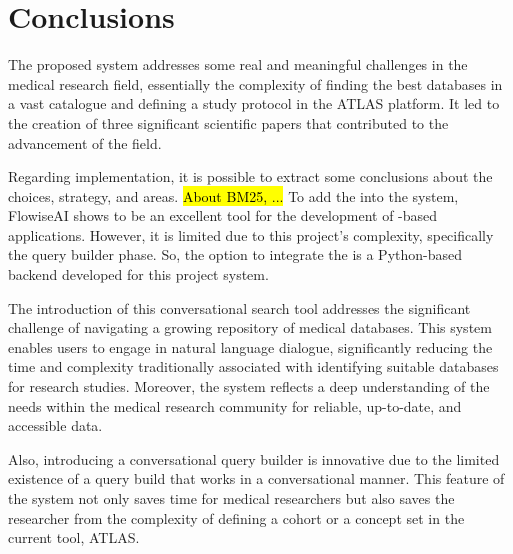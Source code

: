 \chapter{Conclusions}
\label{chapter:Conclusions}




The proposed system addresses some real and meaningful challenges in the medical research field, essentially the complexity of finding the best databases in a vast catalogue and defining a study protocol in the ATLAS platform. It led to the creation of three significant scientific papers that contributed to the advancement of the field.

Regarding implementation, it is possible to extract some conclusions about the choices, strategy, and areas. \hl{About BM25, ...} To add the {\llm} into the system, FlowiseAI shows to be an excellent tool for the development of {\llm}-based applications. However, it is limited due to this project's complexity, specifically the query builder phase. So, the option to integrate the {\llm} is a Python-based backend developed for this project system.

The introduction of this conversational search tool addresses the significant challenge of navigating a growing repository of medical databases. This system enables users to engage in natural language dialogue, significantly reducing the time and complexity traditionally associated with identifying suitable databases for research studies. Moreover, the system reflects a deep understanding of the needs within the medical research community for reliable, up-to-date, and accessible data.

Also, introducing a conversational query builder is innovative due to the limited existence of a query build that works in a conversational manner. This feature of the system not only saves time for medical researchers but also saves the researcher from the complexity of defining a cohort or a concept set in the current tool, ATLAS.

